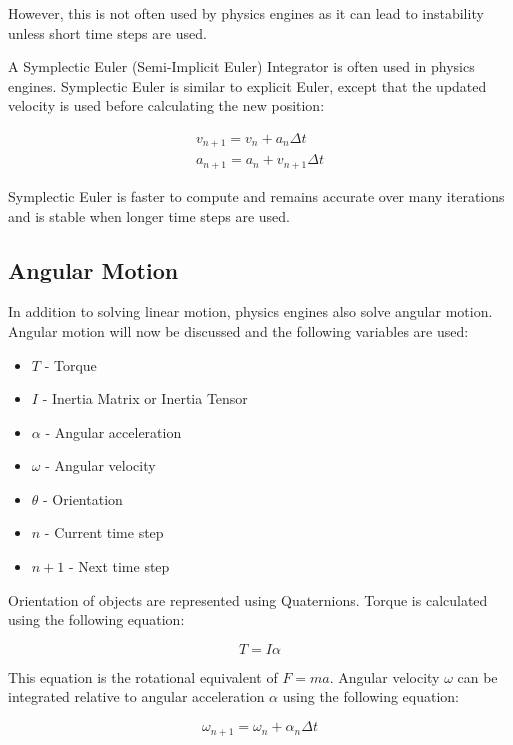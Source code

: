 However, this is not often used by physics engines as it can lead to instability unless short time steps are used.

A Symplectic Euler (Semi-Implicit Euler) Integrator is often used in physics engines. Symplectic Euler is similar to explicit Euler, except that the updated velocity is used before calculating the new position:

\begin{equation}
\begin{split}
	v_{n+1}=v_n+a_n{\Delta}t\\
	a_{n+1}=a_n+v_{n+1}{\Delta}t
\end{split}
\end{equation}

Symplectic Euler is faster to compute and remains accurate over many iterations and is stable when longer time steps are used.

\subsection{Angular Motion}
In addition to solving linear motion, physics engines also solve angular motion. Angular motion will now be discussed and the following variables are used:
\begin{itemize}
	\item $T$ - Torque
	\item $I$ - Inertia Matrix or Inertia Tensor
	\item $\alpha$ - Angular acceleration
	\item $\omega$ - Angular velocity
	\item $\theta$ - Orientation
	\item $n$ - Current time step
	\item $n+1$ - Next time step
\end{itemize}

Orientation of objects are represented using Quaternions. Torque is calculated using the following equation:

\begin{equation}
T=I\alpha
\end{equation}

This equation is the rotational equivalent of $F=ma$.
Angular velocity $\omega$ can be integrated relative to angular acceleration $\alpha$ using the following equation:

\begin{equation}
\omega_{n+1}=\omega_n+\alpha_n\Delta t
\end{equation}

